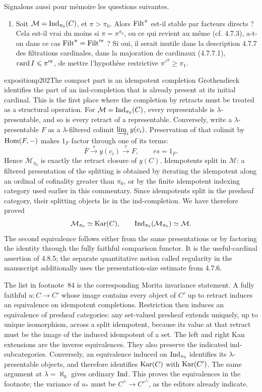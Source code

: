 Signalons aussi pour mémoire les questions suivantes.
\begin{enumerate}
\item[3)] Soit $\mathcal{M}=\operatorname{Ind}_{\pi_0}(C)$, et $\pi>\pi_0$. Alors $\operatorname{Filt}^\pi$ est-il stable par facteurs directs ? Cela est-il vrai du moins si $\pi=\pi^{\pi_0}$, ou ce qui revient au même (cf. 4.7.3), a-t-on dans ce cas $\operatorname{Filt}^\pi=\operatorname{Filt}'^{\pi}$ ? Si oui, il serait inutile dans la description 4.7.7 des filtrations cardinales, dans la majoration de cardinaux (4.7.7.1), $\operatorname{card} I\leqslant\pi'^{\pi}$, de mettre l'hypothèse restrictive $\pi'^{\pi}\geqslant\pi_1$.
\end{enumerate}

\begin{dcomment}{exposition}{p202}{The compact part is an idempotent completion}
Grothendieck identifies the part of an ind-completion that is already present at its initial cardinal. This is the first place where the completion by retracts must be treated as a structural operation. For $\mathcal M=\operatorname{Ind}_{\pi_0}(C)$, every representable is $\lambda$-presentable, and so is every retract of a representable. Conversely, write a $\lambda$-presentable $F$ as a $\lambda$-filtered colimit $\varinjlim_i y(c_i)$. Preservation of that colimit by $\operatorname{Hom}(F,-)$ makes $1_F$ factor through one of its terms:
\[
 F\xrightarrow{s}y(c_i)\xrightarrow{r}F,
 \qquad rs=1_F.
\]
Hence $\mathcal M_{\pi_0}$ is exactly the retract closure of $y(C)$. Idempotents split in $\mathcal M$: a filtered presentation of the splitting is obtained by iterating the idempotent along an ordinal of cofinality greater than $\pi_0$, or by the finite idempotent indexing category used earlier in this commentary. Since idempotents split in the presheaf category, their splitting objects lie in the ind-completion. We have therefore proved
\[
 \mathcal M_{\pi_0}\simeq\operatorname{Kar}(C),\qquad
 \operatorname{Ind}_{\pi_0}(\mathcal M_{\pi_0})\simeq\mathcal M.
\]
The second equivalence follows either from the same presentations or by factoring the identity through the fully faithful comparison functor. It is the useful-cardinal assertion of 4.8.5; the separate quantitative notion called regularity in the manuscript additionally uses the presentation-size estimate from 4.7.6.

The list in footnote~84 is the corresponding Morita invariance statement. A fully faithful $u:C\to C'$ whose image contains every object of $C'$ up to retract induces an equivalence on idempotent completions. Restriction then induces an equivalence of presheaf categories: any set-valued presheaf extends uniquely, up to unique isomorphism, across a split idempotent, because its value at that retract must be the image of the induced idempotent of a set. The left and right Kan extensions are the inverse equivalences. They also preserve the indicated ind-subcategories. Conversely, an equivalence induced on $\operatorname{Ind}_{\pi_0}$ identifies its $\lambda$-presentable objects, and therefore identifies $\operatorname{Kar}(C)$ with $\operatorname{Kar}(C')$. The same argument at $\lambda=\aleph_0$ gives ordinary $\operatorname{Ind}$. This proves the equivalences in the footnote; the variance of $u_*$ must be $C^\wedge\to C'^\wedge$, as the editors already indicate.


\end{dcomment}

